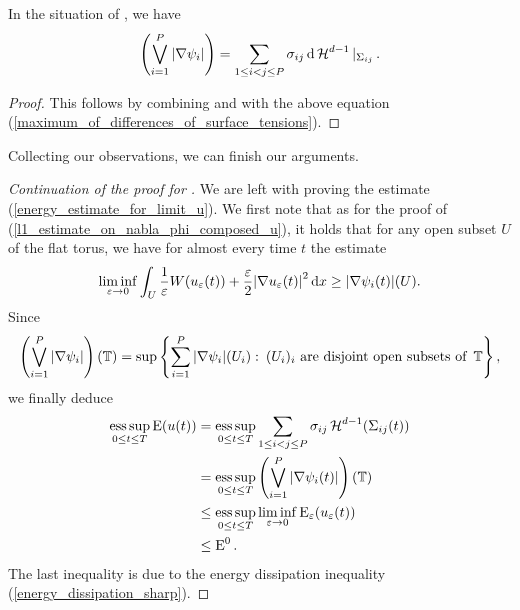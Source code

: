 \begin{proposition}
	\label{supremum_of_abs_nabla_psi_i_is_energy}
	In the situation of  , we have
	\begin{equation*}
		\left(
			\bigvee_{ i = 1 }^{ P }
			\abs{ \nabla \psi_{ i } }
		\right)
		=
		\sum_{ 1 \leq i < j \leq P }
		 \sigma_{ i j }
		 \dd{ \operatorname{\mathcal{H}}^{ d - 1 } |_{ \Sigma_{ i j } } }.
	\end{equation*}
\end{proposition}

\begin{proof}
	This follows by combining  and  with the above equation (\ref{maximum_of_differences_of_surface_tensions}).
\end{proof}

Collecting our observations, we can finish our arguments.

\begin{proof}[Continuation of the proof for ]
	We are left with proving the estimate (\ref{energy_estimate_for_limit_u}). We first note that as for the proof of (\ref{l1_estimate_on_nabla_phi_composed_u}), it holds that for any open subset $ U $ of the flat torus, we have for almost every time $ t $ the estimate
	\begin{equation*}
		\liminf_{ \varepsilon \to 0 } 
			\int_{ U }
				\frac{ 1 }{ \varepsilon }
				W ( u_{ \varepsilon } ( t )  )
				+
				\frac{ \varepsilon }{ 2 }
				\abs{ \nabla u_{ \varepsilon } ( t ) }^{ 2 }
			\dd{ x }
		\geq
		\abs{ \nabla \psi_{ i } ( t ) } ( U ).
	\end{equation*}
	Since
	\begin{equation*}
		\left(
		\bigvee_{ i = 1 }^{ P }
			\abs{ \nabla \psi_{ i } } 
		\right) 
		( \operatorname{\mathbb{T}} )
		=
		\sup \left\{
			\sum_{ i = 1 }^{ P }
				\abs{ \nabla \psi_{ i } } ( U_{ i } )
			\, \colon \,
			( U_{ i } )_{ i } \text{ are disjoint open subsets of } \operatorname{\mathbb{T}}
		\right\},
	\end{equation*}
	we finally deduce
	\begin{align*}
		\operatorname*{ess\,sup}_{ 0 \leq t \leq T }
			\operatorname{E} ( u ( t ) )
		& =
		\operatorname*{ess\,sup}_{ 0 \leq t \leq T }
			\sum_{ 1 \leq i < j \leq P }
				\sigma_{ i j }
				\operatorname{\mathcal{H}}^{ d - 1 } ( \Sigma_{ i j } ( t ) )
		\\
		& = \operatorname*{ess\,sup}_{ 0 \leq t \leq T }
		\left(
			\bigvee_{ i = 1 }^{ P }
				\abs{ \nabla \psi_{ i } ( t ) }
		\right) ( \operatorname{\mathbb{T}} )
		\\
		& \leq
		\operatorname*{ess\,sup}_{ 0 \leq t \leq T }
			\liminf_{ \varepsilon \to 0 }
				\operatorname{E}_{ \varepsilon } ( u_{ \varepsilon } ( t ) )
		\\
		& \leq
		\operatorname{E}^{ 0 }.
	\end{align*}
	The last inequality is due to the energy dissipation inequality 
	(\ref{energy_dissipation_sharp}).
\end{proof}

